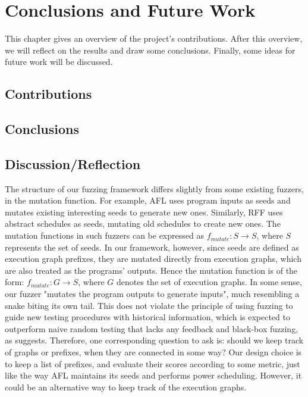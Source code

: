 \chapter{\label{cha:conclusion}Conclusions and Future
  Work}

This chapter gives an overview of the project's contributions. After
this overview, we will reflect on the results and draw some
conclusions. Finally, some ideas for future work will be discussed.

\section{Contributions}



\section{Conclusions}


\section{Discussion/Reflection}

The structure of our fuzzing framework differs slightly from some existing fuzzers, in the mutation function. For example, AFL uses program inputs as seeds and mutates existing interesting seeds to generate new ones. Similarly, RFF uses abstract schedules as seeds, mutating old schedules to create new ones. The mutation functions in such fuzzers can be expressed as $f_{mutate}: S \to S$, where $S$ represents the set of seeds.  In our framework, however, since seeds are defined as execution graph prefixes, they are mutated directly from execution graphs, which are also treated as the programs' outputs. Hence the mutation function is of the form: $f_{mutate}: G \to S$, where $G$ denotes the set of execution graphs. In some sense, our fuzzer "mutates the program outputs to generate inputs", much resembling a snake biting its own tail. This does not violate the principle of using fuzzing to guide new testing procedures with historical information, which is expected to outperform naive random testing that lacks any feedback and black-box fuzzing, as \cite{sage} suggests. Therefore, one corresponding question to ask is: should we keep track of graphs or prefixes, when they are connected in some way? Our design choice is to keep a list of prefixes, and evaluate their scores according to some metric, just like the way AFL maintains its seeds and performs power scheduling. However, it could be an alternative way to keep track of the execution graphs.


